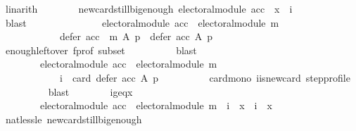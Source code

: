 \begin{isabellebody}
\ linarith\isanewline
\ \ \ \ \ \ \isamarkupfalse%
\ new{\isacharunderscore}{\kern0pt}card{\isacharunderscore}{\kern0pt}still{\isacharunderscore}{\kern0pt}big{\isacharunderscore}{\kern0pt}enough{\isacharcolon}{\kern0pt}\ {\isachardoublequoteopen}electoral{\isacharunderscore}{\kern0pt}module\ acc\ {\isasymlongrightarrow}\ x\ {\isasymle}\ i{\isachardoublequoteclose}\isanewline
\ \ \ \ \ \ \ \ \isamarkupfalse%
\ blast\isanewline
\ \ \ \ \ \ \isamarkupfalse%
\isanewline
\ \ \ \ \ \ \ \ {\isachardoublequoteopen}electoral{\isacharunderscore}{\kern0pt}module\ acc\ {\isasymand}\ electoral{\isacharunderscore}{\kern0pt}module\ m\ {\isasymlongrightarrow}\isanewline
\ \ \ \ \ \ \ \ \ \ \ \ defer\ {\isacharparenleft}{\kern0pt}acc\ {\isasymtriangleright}\ m{\isacharparenright}{\kern0pt}\ A\ p\ {\isasymsubseteq}\ defer\ acc\ A\ p{\isachardoublequoteclose}\isanewline
\ \ \ \ \ \ \ \ \isamarkupfalse%
\ enough{\isacharunderscore}{\kern0pt}leftover\ f{\isacharunderscore}{\kern0pt}prof\ subset\isanewline
\ \ \ \ \ \ \ \ \isamarkupfalse%
\ blast\isanewline
\ \ \ \ \ \ \isamarkupfalse%
\isanewline
\ \ \ \ \ \ \ \ {\isachardoublequoteopen}electoral{\isacharunderscore}{\kern0pt}module\ acc\ {\isasymand}\ electoral{\isacharunderscore}{\kern0pt}module\ m\ {\isasymlongrightarrow}\isanewline
\ \ \ \ \ \ \ \ \ \ \ \ i\ {\isasymle}\ card\ {\isacharparenleft}{\kern0pt}defer\ acc\ A\ p{\isacharparenright}{\kern0pt}{\isachardoublequoteclose}\isanewline
\ \ \ \ \ \ \ \ \isamarkupfalse%
\ card{\isacharunderscore}{\kern0pt}mono\ i{\isacharunderscore}{\kern0pt}is{\isacharunderscore}{\kern0pt}new{\isacharunderscore}{\kern0pt}card\ step{\isacharunderscore}{\kern0pt}profile\isanewline
\ \ \ \ \ \ \ \ \isamarkupfalse%
\ blast\isanewline
\ \ \ \ \ \ \isamarkupfalse%
\ i{\isacharunderscore}{\kern0pt}geq{\isacharunderscore}{\kern0pt}x{\isacharcolon}{\kern0pt}\isanewline
\ \ \ \ \ \ \ \ {\isachardoublequoteopen}electoral{\isacharunderscore}{\kern0pt}module\ acc\ {\isasymand}\ electoral{\isacharunderscore}{\kern0pt}module\ m\ {\isasymlongrightarrow}\ {\isacharparenleft}{\kern0pt}i\ {\isacharequal}{\kern0pt}\ x\ {\isasymor}\ i\ {\isachargreater}{\kern0pt}\ x{\isacharparenright}{\kern0pt}{\isachardoublequoteclose}\isanewline
\ \ \ \ \ \ \ \ \isamarkupfalse%
\ nat{\isacharunderscore}{\kern0pt}less{\isacharunderscore}{\kern0pt}le\ new{\isacharunderscore}{\kern0pt}card{\isacharunderscore}{\kern0pt}still{\isacharunderscore}{\kern0pt}big{\isacharunderscore}{\kern0pt}enough\isanewline

\end{isabellebody}
